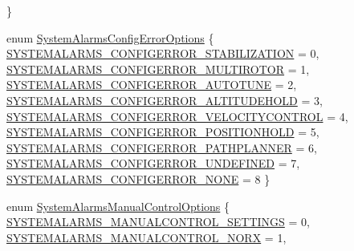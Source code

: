\begin{DoxyCompactItemize}
 \}
\item 
enum \hyperlink{group___system_alarms_gae120cba3616c39c5568ed2b33c3cf774}{\-System\-Alarms\-Config\-Error\-Options} \{ \*
\hyperlink{group___system_alarms_ggae120cba3616c39c5568ed2b33c3cf774a83795b2e0eef3a1a820d67b5f69351ce}{\-S\-Y\-S\-T\-E\-M\-A\-L\-A\-R\-M\-S\-\_\-\-C\-O\-N\-F\-I\-G\-E\-R\-R\-O\-R\-\_\-\-S\-T\-A\-B\-I\-L\-I\-Z\-A\-T\-I\-O\-N} = 0, 
\hyperlink{group___system_alarms_ggae120cba3616c39c5568ed2b33c3cf774a0fc041d095792edc0a8c2a776b3aafd6}{\-S\-Y\-S\-T\-E\-M\-A\-L\-A\-R\-M\-S\-\_\-\-C\-O\-N\-F\-I\-G\-E\-R\-R\-O\-R\-\_\-\-M\-U\-L\-T\-I\-R\-O\-T\-O\-R} = 1, 
\hyperlink{group___system_alarms_ggae120cba3616c39c5568ed2b33c3cf774a551e7a19666d18084f6eddc4554fd1c4}{\-S\-Y\-S\-T\-E\-M\-A\-L\-A\-R\-M\-S\-\_\-\-C\-O\-N\-F\-I\-G\-E\-R\-R\-O\-R\-\_\-\-A\-U\-T\-O\-T\-U\-N\-E} = 2, 
\hyperlink{group___system_alarms_ggae120cba3616c39c5568ed2b33c3cf774a3a8bc49825359d0498165998dba83ec1}{\-S\-Y\-S\-T\-E\-M\-A\-L\-A\-R\-M\-S\-\_\-\-C\-O\-N\-F\-I\-G\-E\-R\-R\-O\-R\-\_\-\-A\-L\-T\-I\-T\-U\-D\-E\-H\-O\-L\-D} = 3, 
\*
\hyperlink{group___system_alarms_ggae120cba3616c39c5568ed2b33c3cf774a2d0a282d0bc8b0d6b8f12d817c08c4c4}{\-S\-Y\-S\-T\-E\-M\-A\-L\-A\-R\-M\-S\-\_\-\-C\-O\-N\-F\-I\-G\-E\-R\-R\-O\-R\-\_\-\-V\-E\-L\-O\-C\-I\-T\-Y\-C\-O\-N\-T\-R\-O\-L} = 4, 
\hyperlink{group___system_alarms_ggae120cba3616c39c5568ed2b33c3cf774a6b2811ba224d2fc30d93d4c933c9889e}{\-S\-Y\-S\-T\-E\-M\-A\-L\-A\-R\-M\-S\-\_\-\-C\-O\-N\-F\-I\-G\-E\-R\-R\-O\-R\-\_\-\-P\-O\-S\-I\-T\-I\-O\-N\-H\-O\-L\-D} = 5, 
\hyperlink{group___system_alarms_ggae120cba3616c39c5568ed2b33c3cf774ad7a60358c5c661f93a66852ee6055e2a}{\-S\-Y\-S\-T\-E\-M\-A\-L\-A\-R\-M\-S\-\_\-\-C\-O\-N\-F\-I\-G\-E\-R\-R\-O\-R\-\_\-\-P\-A\-T\-H\-P\-L\-A\-N\-N\-E\-R} = 6, 
\hyperlink{group___system_alarms_ggae120cba3616c39c5568ed2b33c3cf774a3cc3c8b1a00b2a27d6de828d7c3ed12b}{\-S\-Y\-S\-T\-E\-M\-A\-L\-A\-R\-M\-S\-\_\-\-C\-O\-N\-F\-I\-G\-E\-R\-R\-O\-R\-\_\-\-U\-N\-D\-E\-F\-I\-N\-E\-D} = 7, 
\*
\hyperlink{group___system_alarms_ggae120cba3616c39c5568ed2b33c3cf774acbe8959da7c8cb7c7f2eafb6d5e9bf18}{\-S\-Y\-S\-T\-E\-M\-A\-L\-A\-R\-M\-S\-\_\-\-C\-O\-N\-F\-I\-G\-E\-R\-R\-O\-R\-\_\-\-N\-O\-N\-E} = 8
 \}
\item 
enum \hyperlink{group___system_alarms_ga85e0a17342a1de346ffcee73de9b5f81}{\-System\-Alarms\-Manual\-Control\-Options} \{ \*
\hyperlink{group___system_alarms_gga85e0a17342a1de346ffcee73de9b5f81af06560a70bc2b25b73d17e15918727f3}{\-S\-Y\-S\-T\-E\-M\-A\-L\-A\-R\-M\-S\-\_\-\-M\-A\-N\-U\-A\-L\-C\-O\-N\-T\-R\-O\-L\-\_\-\-S\-E\-T\-T\-I\-N\-G\-S} = 0, 
\hyperlink{group___system_alarms_gga85e0a17342a1de346ffcee73de9b5f81a72836e69233e369062076eaad9f5ed50}{\-S\-Y\-S\-T\-E\-M\-A\-L\-A\-R\-M\-S\-\_\-\-M\-A\-N\-U\-A\-L\-C\-O\-N\-T\-R\-O\-L\-\_\-\-N\-O\-R\-X} = 1, 

\end{DoxyCompactItemize}
